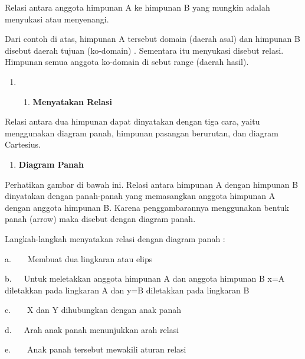 \documentclass[11pt,fleqn]{book} %
\begin{document}
\noindent 

\noindent Relasi antara anggota himpunan A ke himpunan B yang mungkin adalah menyukasi atau menyenangi.

\noindent Dari contoh di atas, himpunan A tersebut domain (daerah asal) dan himpunan B disebut daerah tujuan (ko-domain) . Sementara itu menyukasi disebut relasi. Himpunan semua anggota ko-domain di sebut range (daerah hasil).

\noindent 

\begin{enumerate}
\item \begin{enumerate}
\item  \textbf{Menyatakan Relasi}
\end{enumerate}
\end{enumerate}

\noindent 

Relasi antara dua himpunan dapat dinyatakan dengan tiga cara, yaitu menggunakan diagram panah, himpunan pasangan berurutan, dan diagram Cartesius.



\begin{enumerate}
\item  \textbf{Diagram Panah}
\end{enumerate}

\noindent 

\noindent Perhatikan gambar di bawah ini. Relasi antara himpunan A dengan himpunan B dinyatakan dengan panah-panah yang memasangkan anggota himpunan A dengan anggota himpunan B. Karena penggambarannya menggunakan bentuk panah (arrow) maka disebut dengan diagram panah.

\noindent 

\noindent Langkah-langkah menyatakan relasi dengan diagram panah :

\noindent 

\noindent a.~~~~Membuat dua lingkaran atau elips

\noindent b.~~~Untuk meletakkan anggota himpunan A dan anggota himpunan B x=A diletakkan pada lingkaran A dan y=B diletakkan pada lingkaran B

\noindent c.~~~~X dan Y dihubungkan dengan anak panah

\noindent d.~~~Arah anak panah menunjukkan arah relasi

\noindent e.~~~~Anak panah tersebut mewakili aturan relasi

\noindent 
\end{document}
